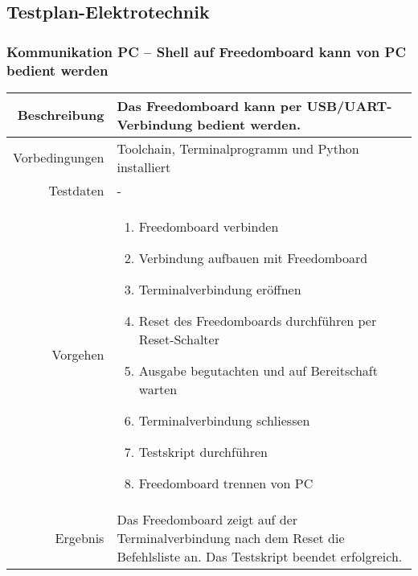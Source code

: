 \subsection{Testplan-Elektrotechnik}
\subsubsection{Kommunikation PC -- Shell auf Freedomboard kann von PC bedient werden}
\begin{table}[h!]
	\renewcommand{\arraystretch}{1.5}
	\begin{tabular}{|r|p{14cm}|}
		\hline Beschreibung	&
			Das Freedomboard kann per USB/UART-Verbindung bedient werden. \\ 
		\hline Vorbedingungen	&
			Toolchain, Terminalprogramm und Python installiert \\ 
		\hline Testdaten	& - \\ 
		\hline Vorgehen		& 
		\begin{enumerate}
			\item Freedomboard verbinden
			\item Verbindung aufbauen mit Freedomboard
			\item Terminalverbindung eröffnen
			\item Reset des Freedomboards durchführen per Reset-Schalter
			\item Ausgabe begutachten und auf Bereitschaft warten
			\item Terminalverbindung schliessen
			\item Testskript durchführen
			\item Freedomboard trennen von PC 
		\end{enumerate} \\ 
		\hline Ergebnis 	&
			Das Freedomboard zeigt auf der Terminalverbindung nach dem
			Reset die Befehlsliste an. Das Testskript beendet erfolgreich.\\ 
		\hline 
	\end{tabular}
\end{table}

\newpage
